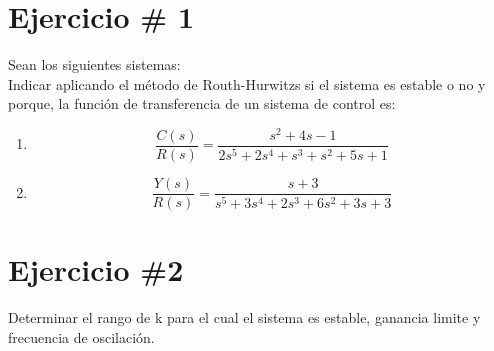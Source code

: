 \documentclass[12pt]{article}
\begin{document}
\section*{Ejercicio \# 1}
Sean los siguientes sistemas:\\ 

Indicar aplicando el m\'etodo de Routh-Hurwitzs si el sistema es estable o no y porque,
la funci\'on de transferencia de un sistema de control es:

\renewcommand{\theenumi}{\alph{enumi}}

\begin{enumerate}
  \item $$\dfrac{C(s)}{R(s)}=\dfrac{s^2+4s-1}{2s^5+2s^4+s^3+s^2+5s+1}$$
  \item $$\dfrac{Y(s)}{R(s)}=\dfrac{s+3}{s^5+3s^4+2s^3+6s^2+3s+3}$$
\end{enumerate}

\vspace{1cm}

\section*{Ejercicio \#2}

Determinar el rango de k para el cual el sistema es estable,
ganancia limite y frecuencia de oscilaci\'on.

\vspace{1cm}
\end{document}
